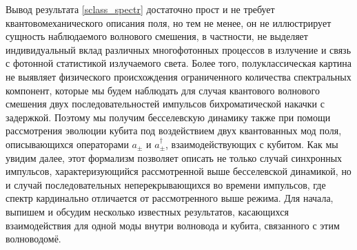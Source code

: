 Вывод результата \eqref{sclass_spectr} достаточно прост и не требует квантовомеханического описания поля, но тем не менее, он не иллюстрирует сущность наблюдаемого волнового смешения, в частности, не выделяет индивидуальный вклад различных многофотонных процессов в излучение и связь с фотонной статистикой излучаемого света. Более того, полуклассическая картина не выявляет физического происхождения ограниченного количества спектральных компонент, которые мы будем наблюдать для случая квантового волнового смешения двух последовательностей импульсов бихроматической накачки с задержкой. Поэтому мы получим бесселевскую динамику также при помощи рассмотрения эволюции кубита под воздействием двух квантованных мод поля, описывающихся операторами $a_\pm$ и $a_\pm^\dag$, взаимодействующих с кубитом. Как мы увидим далее, этот формализм позволяет описать не только случай синхронных импульсов, характеризующийся рассмотренной выше бесселевской динамикой, но и случай последовательных неперекрывающихся во времени импульсов, где спектр кардинально отличается от рассмотренного выше режима. Для начала, выпишем и обсудим несколько известных результатов, касающихся взаимодействия для одной моды внутри волновода и кубита, связанного с этим волноводомё. 

